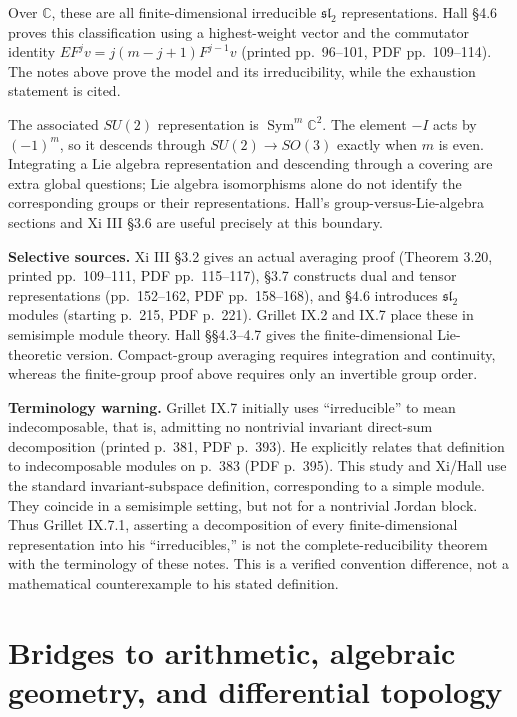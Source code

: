 \documentclass[
  11pt,
]{article}
\begin{document}
Over \(\mathbb C\), these are all finite-dimensional irreducible
\(\mathfrak{sl}_2\) representations. Hall §4.6 proves this
classification using a highest-weight vector and the commutator identity
\(E F^jv=j(m-j+1)F^{j-1}v\) (printed pp.~96--101, PDF pp.~109--114). The
notes above prove the model and its irreducibility, while the exhaustion
statement is cited.

The associated \(SU(2)\) representation is
\(\operatorname{Sym}^m\mathbb C^2\). The element \(-I\) acts by
\((-1)^m\), so it descends through \(SU(2)\to SO(3)\) exactly when \(m\)
is even. Integrating a Lie algebra representation and descending through
a covering are extra global questions; Lie algebra isomorphisms alone do
not identify the corresponding groups or their representations. Hall's
group-versus-Lie-algebra sections and Xi III §3.6 are useful precisely
at this boundary.

\textbf{Selective sources.} Xi III §3.2 gives an actual averaging proof
(Theorem 3.20, printed pp.~109--111, PDF pp.~115--117), §3.7 constructs
dual and tensor representations (pp.~152--162, PDF pp.~158--168), and
§4.6 introduces \(\mathfrak{sl}_2\) modules (starting p.~215, PDF
p.~221). Grillet IX.2 and IX.7 place these in semisimple module theory.
Hall §§4.3--4.7 gives the finite-dimensional Lie-theoretic version.
Compact-group averaging requires integration and continuity, whereas the
finite-group proof above requires only an invertible group order.

\textbf{Terminology warning.} Grillet IX.7 initially uses
``irreducible'' to mean indecomposable, that is, admitting no nontrivial
invariant direct-sum decomposition (printed p.~381, PDF p.~393). He
explicitly relates that definition to indecomposable modules on p.~383
(PDF p.~395). This study and Xi/Hall use the standard invariant-subspace
definition, corresponding to a simple module. They coincide in a
semisimple setting, but not for a nontrivial Jordan block. Thus Grillet
IX.7.1, asserting a decomposition of every finite-dimensional
representation into his ``irreducibles,'' is not the
complete-reducibility theorem with the terminology of these notes. This
is a verified convention difference, not a mathematical counterexample
to his stated definition.

\section{Bridges to arithmetic, algebraic geometry, and differential
topology}\label{bridges-to-arithmetic-algebraic-geometry-and-differential-topology}
\end{document}

